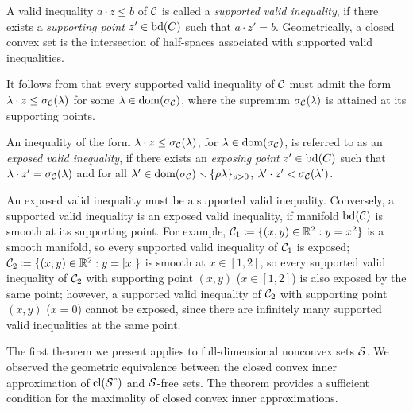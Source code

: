  A valid inequality $a \cdot z \le b$ of $\mathcal C$ is  called a \emph{supported valid inequality}, if there exists a \emph{supporting point} $z' \in \operatorname{bd}(C)$ such that \(a \cdot z' =  b\).  Geometrically, a closed convex set is the intersection of half-spaces associated with supported valid inequalities.


 \begin{observation}
  It follows from  that every supported valid inequality of $\mathcal C$ must admit the form $\lambda \cdot z\le \sigma_{\mathcal C}(\lambda)$  for some $\lambda \in \operatorname{dom}(\sigma_{\mathcal C})$, where the supremum  $\sigma_{\mathcal C}(\lambda)$ is attained at its supporting points.
 \end{observation}

An inequality of the form $\lambda \cdot z \leq \sigma_{\mathcal C}(\lambda)$, for $\lambda \in \operatorname{dom}(\sigma_{\mathcal C})$, is referred to as an \emph{exposed valid inequality}, if there exists an \emph{exposing point} $z' \in \operatorname{bd}(C)$ such that $\lambda \cdot z' = \sigma_{\mathcal C}(\lambda)$ and  for all \({\lambda'} \in \operatorname{dom}(\sigma_\mathcal C) \smallsetminus\{{\rho\lambda}\}_{\rho > 0}\), \({\lambda'}\cdot z' < \sigma_{\mathcal C}(\lambda')\).
 
  \begin{observation}
  \label{obs.1}
An exposed valid inequality must be a supported valid inequality. Conversely, a supported valid inequality  is  an exposed valid inequality, if manifold $\operatorname{bd}(\mathcal C)$ is smooth at its supporting point.  For example, $\mathcal C_1\coloneqq\{(x,y) \in \mathbb R^2: y = x^2\}$ is a smooth manifold, so every supported valid inequality of $\mathcal C_1$ is exposed; $\mathcal C_2\coloneqq\{(x,y) \in \mathbb R^2: y = |x|\}$ is smooth at $x \in [1,2]$, so every supported valid inequality of $\mathcal C_2$ with supporting point $(x,y)$ ($x \in [1,2]$)  is  also exposed by the same point; however,  a supported valid inequality of $\mathcal C_2$ with supporting point $(x,y)$ ($x = 0$)  cannot be exposed, since there are infinitely many  supported valid inequalities at the same point.
 \end{observation}
 

The first theorem we present applies to full-dimensional nonconvex sets $\mathcal S$. We observed the geometric equivalence between the closed convex inner approximation of $\operatorname{cl}(\mathcal S^c)$ and $\mathcal S$-free sets. The theorem provides a sufficient condition for the maximality of closed convex inner approximations.


